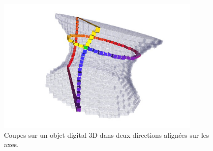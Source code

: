 \begin{figure}[ht]
    \begin{center}
      \includegraphics[width=10cm]{images/Curvature/ctopo3dSurfelCut}
    \end{center}
    \caption[Coupes sur un objet digital 3D.]{Coupes sur un objet digital 3D dans deux directions alignées sur les axes.}
    \label{fig:3d-dig-object-slices}
\end{figure}

